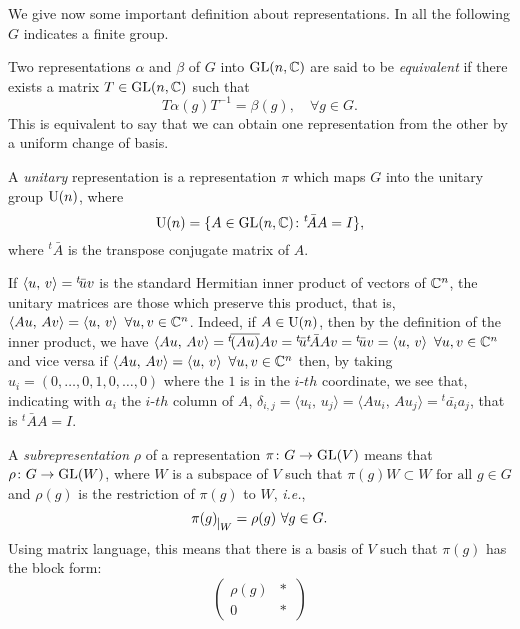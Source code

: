 We give now some important definition about representations. In all the following $G$ indicates a finite group.
\begin{defn}
\label{equiv:repres}
Two representations $\alpha$ and $\beta$ of $G$ into $\operatorname{GL}(n,{\mathbb C})$ are said to be \emph{equivalent}
if there exists a matrix $T \in \operatorname{GL}(n,{\mathbb C})$ such that
\[
T\alpha(g)T^{-1}=\beta(g), \quad \forall g \in G.
\]
This is equivalent to say that we can obtain one representation from the other by a uniform change of basis.
\end{defn}

\begin{defn}
\label{def:unitary}
A \emph{unitary} representation is a representation $\pi$ which maps $G$ into the unitary group $\operatorname{U}(n)$, where 
\[
\operatorname{U}(n) =\{A\in \operatorname{GL}(n,{\mathbb C}) \colon {}^{t}\!\bar{A}A=I\},
\]
where ${}^{t}\!\bar{A}$ is the transpose conjugate matrix of $A$.
\end{defn}
\begin{rem}
If $\Braket{u, \, v} = {}^t\!\bar{u}v$ is the standard Hermitian inner product of vectors of ${\mathbb C}^{n}$, the unitary matrices are those which preserve this product, that is, $\Braket{Au, \, Av} =\Braket{u, \, v} \ \forall u,v \in {\mathbb C}^{n}$.
Indeed, if $A \in \operatorname{U}(n)$, then by the definition of the inner product, we have $\Braket{Au, \, Av}={}^{t}\!\overline{(Au)}Av={}^t\!\bar{u}{}^t\!\bar{A}Av={}^t\!\bar{u}v=\Braket{u,\, v} \ \forall u,v \in {\mathbb C}^{n}$ and vice versa if $\Braket{Au, \, Av} =\Braket{u, \, v} \ \forall u,v \in {\mathbb C}^{n}$ then, by taking $u_i=(0,\dots ,0, 1, 0,\dots , 0)$ where the $1$ is in the $i$-$th$ coordinate, we see that, indicating with $a_i$ the $i$-$th$ column of $A$, $\delta_{i,j}=\langle u_i, \, u_j\rangle =\langle Au_i, \, Au_j\rangle={}^t\!\bar{a_i}a_j$, that is ${}^{t}\!\bar{A}A=I$.
\end{rem}
\begin{defn}
A \emph{subrepresentation} $\rho$ of a representation $\pi\colon G \rightarrow \operatorname{GL}(V)$ means that $\rho\colon G \rightarrow \operatorname{GL}(W)$, where $W$ is a subspace of $V$ such that $\pi(g)W\subset W \text{ for all }g \in G$ and $\rho(g)$ is the restriction of $\pi(g)$ to $W$, \emph{i.e.},
\[
\pi(g)_{\mkern 1mu \vrule height 2ex\mkern2mu W}= \rho(g)\ \forall g \in G.
\]
Using matrix language, this means that there is a basis of $V$ such that $\pi(g)$ has the block form:
\[
\begin{pmatrix}
\rho(g) & \ast \ \\
0 & \ast \
\end{pmatrix}
\]
\end{defn}
